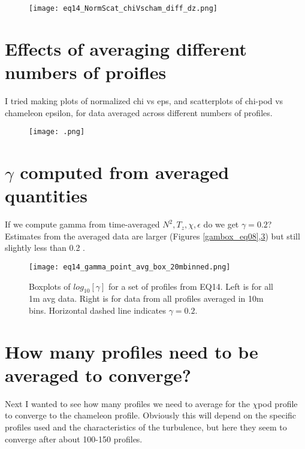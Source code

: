 \documentclass[11pt]{article}
\begin{document}
\begin{figure}[htbp]
\texttt{[image: eq14\_NormScat\_chiVscham\_diff\_dz.png]}
\caption{}
\label{}
\end{figure}




\clearpage
\section{Effects of averaging different numbers of proifles}

I tried making plots of normalized chi vs eps, and scatterplots of chi-pod vs chameleon epsilon, for data averaged across different numbers of profiles.

\begin{figure}[htbp]
\texttt{[image: .png]}
\caption{}
\label{}
\end{figure}







\clearpage
\section{$\gamma$ computed from averaged quantities}

If we compute gamma from time-averaged $N^2,T_z,\chi,\epsilon$ do we get $\gamma=0.2$? Estimates from the averaged data are larger (Figures \ref{gambox_eq08},\ref{gambox_eq14}) but still slightly less than 0.2 .

\begin{figure}[htbp]
\texttt{[image: eq14\_gamma\_point\_avg\_box\_20mbinned.png]}
\caption{Boxplots of $log_{10}[\gamma]$ for a set of profiles from EQ14. Left is for all 1m avg data. Right is for data from all profiles averaged in 10m bins. Horizontal dashed line indicates $\gamma=0.2$.}
\label{gambox_eq14}
\end{figure}


\clearpage
\section{How many profiles need to be averaged to converge?}

Next I wanted to see how many profiles we need to average for the $\chi$pod profile to converge to the chameleon profile. Obviously this will depend on the specific profiles used and the characteristics of the turbulence, but here they seem to converge after about 100-150 profiles. 
\end{document}
